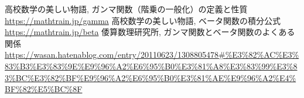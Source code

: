 \documentclass[a4paper,12pt,uplatex,dvipdfmx]{jsarticle}
\theoremstyle{definition}
\begin{document}
\begin{thebibliography}{9}
    高校数学の美しい物語, ガンマ関数（階乗の一般化）の定義と性質 \\
    \url{https://mathtrain.jp/gamma}
    高校数学の美しい物語, ベータ関数の積分公式 \\
    \url{https://mathtrain.jp/beta}
    倭算数理研究所, ガンマ関数とベータ関数のよくある関係 \\
    \url{https://wasan.hatenablog.com/entry/20110623/1308805478#%E3%82%AC%E3%83%B3%E3%83%9E%E9%96%A2%E6%95%B0%E3%81%A8%E3%83%99%E3%83%BC%E3%82%BF%E9%96%A2%E6%95%B0%E3%81%AE%E9%96%A2%E4%BF%82%E5%BC%8F}
\end{thebibliography}
\end{document}

